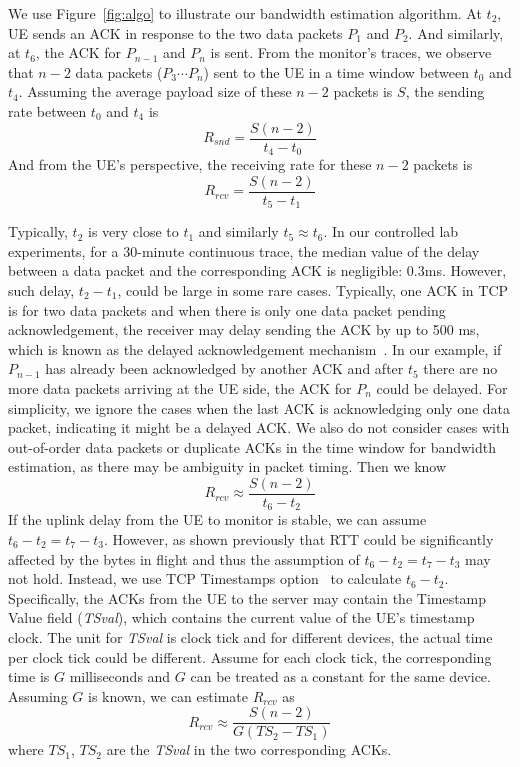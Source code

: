 We use Figure~\ref{fig:algo} to illustrate our bandwidth estimation algorithm. At $t_{2}$, UE sends an ACK in response to the two data packets $P_{1}$ and $P_{2}$. And similarly, at $t_{6}$, the ACK for $P_{n-1}$ and $P_{n}$ is sent. From the monitor's traces, we observe that $n-2$ data packets ($P_{3} \cdots P_{n}$) sent to the UE in a time window between $t_{0}$ and $t_{4}$. Assuming the average payload size of these $n-2$ packets is $S$, the sending rate between $t_{0}$ and $t_{4}$ is
\begin{equation}
\label{eq:snd}
R_{snd} = \frac{S (n - 2)}{t_{4} - t_{0}}
\end{equation}
And from the UE's perspective, the receiving rate for these $n-2$ packets is
\begin{displaymath}
R_{rcv} = \frac{S (n - 2)}{t_{5} - t_{1}}
\end{displaymath}

Typically, $t_{2}$ is very close to $t_{1}$ and similarly $t_{5}\approx t_{6}$. In our controlled lab experiments, for a 30-minute continuous trace, the median value of the delay between a data packet and the corresponding ACK is negligible: 0.3ms. However, such delay, \eg $t_{2} - t_{1}$, could be large in some rare cases. Typically, one ACK in TCP is for two data packets and when there is only one data packet pending acknowledgement, the receiver may delay sending the ACK by up to 500 ms, which is known as the delayed acknowledgement mechanism~\cite{rfc1122}. In our example, if $P_{n-1}$ has already been acknowledged by another ACK and after $t_{5}$ there are no more data packets arriving at the UE side, the ACK for $P_{n}$ could be delayed. For simplicity, we ignore the cases when the last ACK is acknowledging only one data packet, indicating it might be a delayed ACK. We also do not consider cases with out-of-order data packets or duplicate ACKs in the time window for bandwidth estimation, as there may be ambiguity in packet timing. Then we know
\begin{displaymath}
R_{rcv} \approx \frac{S (n - 2)}{t_{6} - t_{2}}
\end{displaymath}
If the uplink delay from the UE to monitor is stable, we can assume $t_{6} - t_{2} = t_{7} - t_{3}$. However, as shown previously that RTT could be significantly affected by the bytes in flight and thus the assumption of $t_{6} - t_{2} = t_{7} - t_{3}$ may not hold. Instead, we use TCP Timestamps option~\cite{rfc1323} to calculate $t_{6} - t_{2}$. Specifically, the ACKs from the UE to the server may contain the Timestamp Value field ({\em TSval}), which contains the current value of the UE's timestamp clock. The unit for {\em TSval} is clock tick and for different devices, the actual time per clock tick could be different. Assume for each clock tick, the corresponding time is $G$ milliseconds and $G$ can be treated as a constant for the same device. Assuming $G$ is known, we can estimate $R_{rcv}$ as
\begin{equation}
\label{eq:rcv}
R_{rcv} \approx \frac{S (n - 2)}{G(TS_{2} - TS_{1})}
\end{equation}
where $TS_{1}$, $TS_{2}$ are the \emph{TSval} in the two corresponding ACKs.

